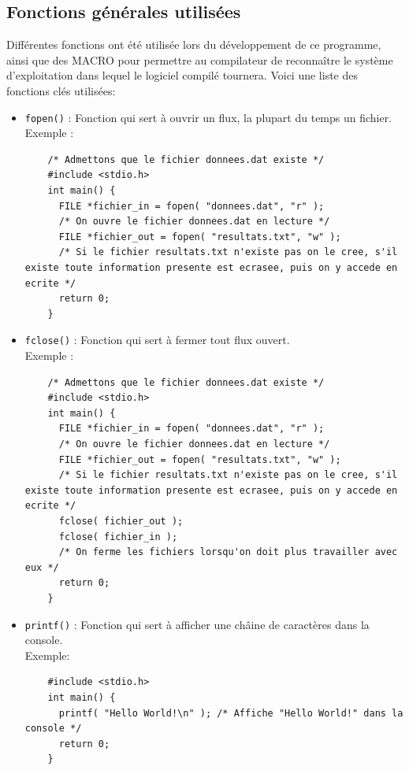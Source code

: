 \documentclass[11pt]{article}
\begin{document}
\subsection{Fonctions générales utilisées}
Différentes fonctions ont été utilisée lors du développement de ce programme, ainsi que des MACRO pour
permettre au compilateur de reconnaître le système d'exploitation dans lequel le logiciel compilé tournera.
Voici une liste des fonctions clés utilisées:
\begin{itemize}
  
\item \texttt{fopen()} : Fonction qui sert à ouvrir un flux, la plupart du temps un fichier.\\
  Exemple :
  \begin{lstlisting}
    /* Admettons que le fichier donnees.dat existe */
    #include <stdio.h>
    int main() {
      FILE *fichier_in = fopen( "donnees.dat", "r" );
      /* On ouvre le fichier donnees.dat en lecture */
      FILE *fichier_out = fopen( "resultats.txt", "w" );
      /* Si le fichier resultats.txt n'existe pas on le cree, s'il existe toute information presente est ecrasee, puis on y accede en ecrite */
      return 0;
    }
  \end{lstlisting}

\item \texttt{fclose()} : Fonction qui sert à fermer tout flux ouvert.\\
  Exemple :
  \begin{lstlisting}
    /* Admettons que le fichier donnees.dat existe */
    #include <stdio.h>
    int main() {
      FILE *fichier_in = fopen( "donnees.dat", "r" );
      /* On ouvre le fichier donnees.dat en lecture */
      FILE *fichier_out = fopen( "resultats.txt", "w" );
      /* Si le fichier resultats.txt n'existe pas on le cree, s'il existe toute information presente est ecrasee, puis on y accede en ecrite */
      fclose( fichier_out );
      fclose( fichier_in );
      /* On ferme les fichiers lorsqu'on doit plus travailler avec eux */
      return 0;
    }
  \end{lstlisting}

  
\item \texttt{printf()} : Fonction qui sert à afficher une châine de caractères dans la console.\\
  Exemple:
  \begin{lstlisting}
    #include <stdio.h>
    int main() {
      printf( "Hello World!\n" ); /* Affiche "Hello World!" dans la console */
      return 0;
    }
  \end{lstlisting}
  

\end{itemize}
\end{document}
